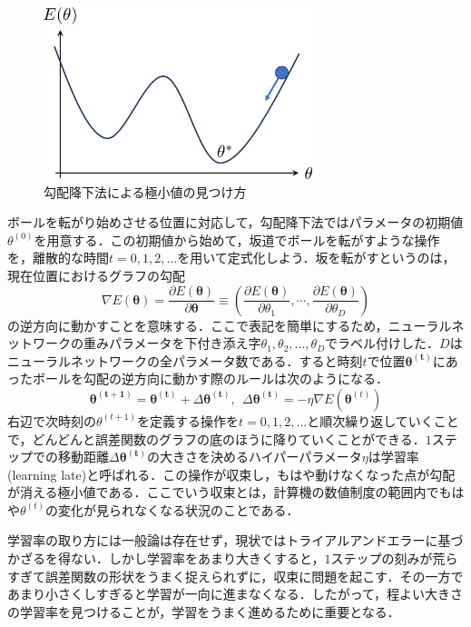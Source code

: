 \documentclass[a4paper,11pt]{jsreport}
\begin{document}
\begin{figure}
  \begin{center}
    \includegraphics[height=5cm]{image/gradient_decent.png}
    \caption{勾配降下法による極小値の見つけ方}
    \label{勾配降下法イメージ図}
  \end{center}
\end{figure}

ボールを転がり始めさせる位置に対応して，勾配降下法ではパラメータの初期値$\theta^{(0)}$を用意する．この初期値から始めて，坂道でボールを転がすような操作を，離散的な時間$t=0,1,2,\dots$を用いて定式化しよう．坂を転がすというのは，現在位置におけるグラフの勾配
\begin{equation}
  \nabla E(\bm{\theta})
  = \frac{\partial E(\bm{\theta})}{\partial \bm{\theta}}
  \equiv \left(  \frac{\partial E(\bm{\theta})}{\partial \theta_1}, \cdots,  \frac{\partial E(\bm{\theta})}{\partial \theta_D} \right)
\end{equation}
の逆方向に動かすことを意味する．ここで表記を簡単にするため，ニューラルネットワークの重みパラメータを下付き添え字$\theta_1,\theta_2,\dots,\theta_D$でラベル付けした．$D$はニューラルネットワークの全パラメータ数である．すると時刻$t$で位置$\bm{\theta^{(t)}}$にあったボールを勾配の逆方向に動かす際のルールは次のようになる．
\begin{equation}
  \bm{\theta^{(t+1)}} = \bm{\theta^{(t)}} + \Delta \bm{\theta^{(t)}} , \ \  \Delta \bm{\theta^{(t)}} = - \eta \nabla E\left( \bm{\theta}^{(t)} \right)
\end{equation}
右辺で次時刻の$\theta^{(t+1)}$を定義する操作を$t=0,1,2,\dots$と順次繰り返していくことで，どんどんと誤差関数のグラフの底のほうに降りていくことができる．$1$ステップでの移動距離$\Delta \bm{\theta^{(t)}}$の大きさを決めるハイパーパラメータ$\eta$は学習率(learning late)と呼ばれる．この操作が収束し，もはや動けなくなった点が勾配が消える極小値である．ここでいう収束とは，計算機の数値制度の範囲内でもはや$\theta^{(t)}$の変化が見られなくなる状況のことである．\par
学習率の取り方には一般論は存在せず，現状ではトライアルアンドエラーに基づかざるを得ない．しかし学習率をあまり大きくすると，$1$ステップの刻みが荒らすぎて誤差関数の形状をうまく捉えられずに，収束に問題を起こす．その一方であまり小さくしすぎると学習が一向に進まなくなる．したがって，程よい大きさの学習率を見つけることが，学習をうまく進めるために重要となる．\par
\end{document}
